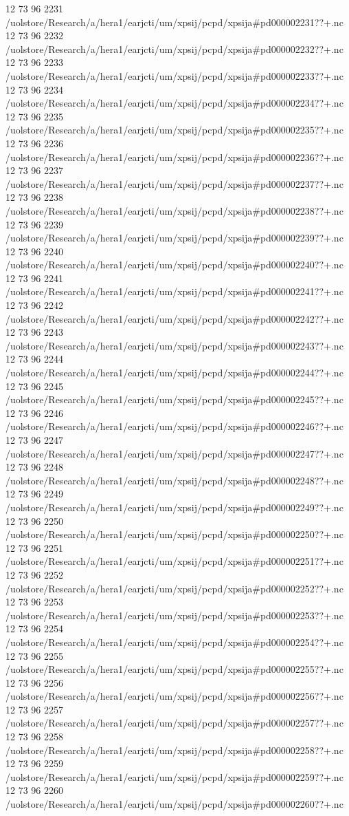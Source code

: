 12 73 96
2231
/uolstore/Research/a/hera1/earjcti/um/xpsij/pcpd/xpsija#pd000002231??+.nc
12 73 96
2232
/uolstore/Research/a/hera1/earjcti/um/xpsij/pcpd/xpsija#pd000002232??+.nc
12 73 96
2233
/uolstore/Research/a/hera1/earjcti/um/xpsij/pcpd/xpsija#pd000002233??+.nc
12 73 96
2234
/uolstore/Research/a/hera1/earjcti/um/xpsij/pcpd/xpsija#pd000002234??+.nc
12 73 96
2235
/uolstore/Research/a/hera1/earjcti/um/xpsij/pcpd/xpsija#pd000002235??+.nc
12 73 96
2236
/uolstore/Research/a/hera1/earjcti/um/xpsij/pcpd/xpsija#pd000002236??+.nc
12 73 96
2237
/uolstore/Research/a/hera1/earjcti/um/xpsij/pcpd/xpsija#pd000002237??+.nc
12 73 96
2238
/uolstore/Research/a/hera1/earjcti/um/xpsij/pcpd/xpsija#pd000002238??+.nc
12 73 96
2239
/uolstore/Research/a/hera1/earjcti/um/xpsij/pcpd/xpsija#pd000002239??+.nc
12 73 96
2240
/uolstore/Research/a/hera1/earjcti/um/xpsij/pcpd/xpsija#pd000002240??+.nc
12 73 96
2241
/uolstore/Research/a/hera1/earjcti/um/xpsij/pcpd/xpsija#pd000002241??+.nc
12 73 96
2242
/uolstore/Research/a/hera1/earjcti/um/xpsij/pcpd/xpsija#pd000002242??+.nc
12 73 96
2243
/uolstore/Research/a/hera1/earjcti/um/xpsij/pcpd/xpsija#pd000002243??+.nc
12 73 96
2244
/uolstore/Research/a/hera1/earjcti/um/xpsij/pcpd/xpsija#pd000002244??+.nc
12 73 96
2245
/uolstore/Research/a/hera1/earjcti/um/xpsij/pcpd/xpsija#pd000002245??+.nc
12 73 96
2246
/uolstore/Research/a/hera1/earjcti/um/xpsij/pcpd/xpsija#pd000002246??+.nc
12 73 96
2247
/uolstore/Research/a/hera1/earjcti/um/xpsij/pcpd/xpsija#pd000002247??+.nc
12 73 96
2248
/uolstore/Research/a/hera1/earjcti/um/xpsij/pcpd/xpsija#pd000002248??+.nc
12 73 96
2249
/uolstore/Research/a/hera1/earjcti/um/xpsij/pcpd/xpsija#pd000002249??+.nc
12 73 96
2250
/uolstore/Research/a/hera1/earjcti/um/xpsij/pcpd/xpsija#pd000002250??+.nc
12 73 96
2251
/uolstore/Research/a/hera1/earjcti/um/xpsij/pcpd/xpsija#pd000002251??+.nc
12 73 96
2252
/uolstore/Research/a/hera1/earjcti/um/xpsij/pcpd/xpsija#pd000002252??+.nc
12 73 96
2253
/uolstore/Research/a/hera1/earjcti/um/xpsij/pcpd/xpsija#pd000002253??+.nc
12 73 96
2254
/uolstore/Research/a/hera1/earjcti/um/xpsij/pcpd/xpsija#pd000002254??+.nc
12 73 96
2255
/uolstore/Research/a/hera1/earjcti/um/xpsij/pcpd/xpsija#pd000002255??+.nc
12 73 96
2256
/uolstore/Research/a/hera1/earjcti/um/xpsij/pcpd/xpsija#pd000002256??+.nc
12 73 96
2257
/uolstore/Research/a/hera1/earjcti/um/xpsij/pcpd/xpsija#pd000002257??+.nc
12 73 96
2258
/uolstore/Research/a/hera1/earjcti/um/xpsij/pcpd/xpsija#pd000002258??+.nc
12 73 96
2259
/uolstore/Research/a/hera1/earjcti/um/xpsij/pcpd/xpsija#pd000002259??+.nc
12 73 96
2260
/uolstore/Research/a/hera1/earjcti/um/xpsij/pcpd/xpsija#pd000002260??+.nc
